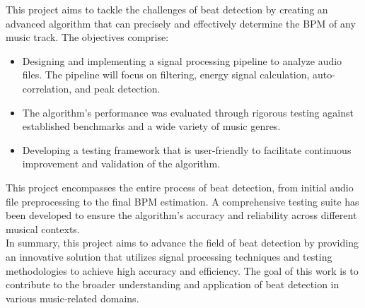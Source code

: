This project aims to tackle the challenges of beat detection by creating an advanced algorithm that can precisely and effectively determine the BPM of any music track. The objectives comprise:
\begin{itemize}
    \item Designing and implementing a signal processing pipeline to analyze audio files. The pipeline will focus on filtering, energy signal calculation, auto-correlation, and peak detection.
    \item The algorithm's performance was evaluated through rigorous testing against established benchmarks and a wide variety of music genres.
    \item Developing a testing framework that is user-friendly to facilitate continuous improvement and validation of the algorithm.
\end{itemize}

This project encompasses the entire process of beat detection, from initial audio file preprocessing to the final BPM estimation. A comprehensive testing suite has been developed to ensure the algorithm's accuracy and reliability across different musical contexts. \\

In summary, this project aims to advance the field of beat detection by providing an innovative solution that utilizes signal processing techniques and testing methodologies to achieve high accuracy and efficiency. The goal of this work is to contribute to the broader understanding and application of beat detection in various music-related domains.
